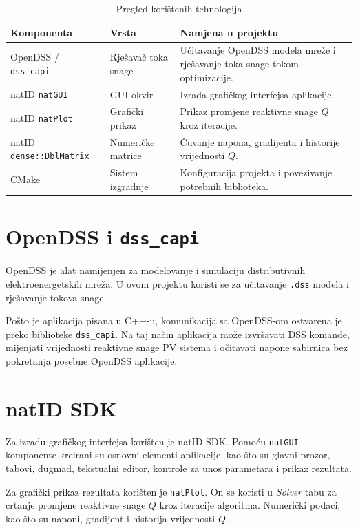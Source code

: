 \documentclass[12pt,oneside, a4paper]{book}
\begin{document}
\begin{table}[H]
\centering
\caption{Pregled korištenih tehnologija}
\label{tab:tehnologije}
\renewcommand{\arraystretch}{1.25}
\begin{tabular}{|L{3.2cm}|L{3cm}|L{8.3cm}|}
\hline
\textbf{Komponenta} & \textbf{Vrsta} & \textbf{Namjena u projektu} \\\hline
OpenDSS / \texttt{dss\_capi} & Rješavač toka snage & Učitavanje OpenDSS modela mreže i rješavanje toka snage tokom optimizacije. \\\hline
natID \texttt{natGUI} & GUI okvir & Izrada grafičkog interfejsa aplikacije. \\\hline
natID \texttt{natPlot} & Grafički prikaz & Prikaz promjene reaktivne snage $Q$ kroz iteracije. \\\hline
natID \texttt{dense::DblMatrix} & Numeričke matrice & Čuvanje napona, gradijenta i historije vrijednosti $Q$. \\\hline
CMake & Sistem izgradnje & Konfiguracija projekta i povezivanje potrebnih biblioteka. \\\hline
\end{tabular}
\end{table}

\section{OpenDSS i \texttt{dss\_capi}}

OpenDSS je alat namijenjen za modelovanje i simulaciju distributivnih elektroenergetskih mreža. U ovom projektu koristi se za učitavanje \texttt{.dss} modela i rješavanje tokova snage.

Pošto je aplikacija pisana u C++-u, komunikacija sa OpenDSS-om ostvarena je preko biblioteke \texttt{dss\_capi}. Na taj način aplikacija može izvršavati DSS komande, mijenjati vrijednosti reaktivne snage PV sistema i očitavati napone sabirnica bez pokretanja posebne OpenDSS aplikacije.

\section{natID SDK}

Za izradu grafičkog interfejsa korišten je natID SDK. Pomoću \texttt{natGUI} komponente kreirani su osnovni elementi aplikacije, kao što su glavni prozor, tabovi, dugmad, tekstualni editor, kontrole za unos parametara i prikaz rezultata.

Za grafički prikaz rezultata korišten je \texttt{natPlot}. On se koristi u \textit{Solver} tabu za crtanje promjene reaktivne snage $Q$ kroz iteracije algoritma. Numerički podaci, kao što su naponi, gradijent i historija vrijednosti $Q$.
\end{document}
